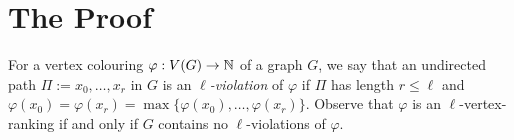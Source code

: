 \documentclass{patmorin}
\newcommand{\defin}[1]{\emph{\color{brightmaroon}#1}}
\newcommand{\rn}[1]{\chi_{\operatorname{#1-vr}}}
\newcommand{\lrn}{\rn{\ell}}
\begin{document}
\section{The Proof}
\label{the_proof}

For a vertex colouring $\varphi:V(G)\to\mathbb{N}$ of a graph $G$, we say that an undirected path $\Pi:=x_0,\ldots,x_r$ in $G$ is an \defin{$\ell$-violation} of $\varphi$ if $\Pi$ has length $r\le\ell$ and $\varphi(x_0)=\varphi(x_r)=\max\{\varphi(x_0),\ldots,\varphi(x_r)\}$.  Observe that $\varphi$ is an $\ell$-vertex-ranking if and only if $G$ contains no $\ell$-violations of $\varphi$.


\end{document}
